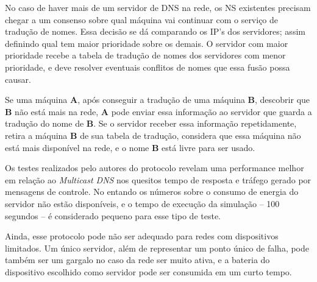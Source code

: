     No caso de haver mais de um servidor de DNS na rede, os NS existentes precisam
    chegar a um consenso sobre qual máquina vai continuar com o serviço de tradução
    de nomes. Essa decisão se dá comparando os IP's dos servidores; assim definindo
    qual tem maior prioridade sobre os demais. O servidor com maior prioridade recebe
    a tabela de tradução de nomes dos servidores com menor prioridade, e deve resolver
    eventuais conflitos de nomes que essa fusão possa causar.
  
    Se uma máquina \textbf{A}, após conseguir a tradução de uma máquina \textbf{B},
    descobrir que \textbf{B} não está mais na rede, \textbf{A} pode enviar essa 
    informação ao servidor que guarda a tradução do nome de \textbf{B}. Se o servidor
    receber essa informação repetidamente, retira a máquina \textbf{B} de sua 
    tabela de tradução, considera que essa máquina não está mais disponível na 
    rede, e o nome \textbf{B} está livre para ser usado.
  
    Os testes realizados pelo autores do protocolo revelam uma performance melhor
    em relação ao \textit{Multicast DNS} nos quesitos tempo de resposta e tráfego
    gerado por mensagens de controle. No entando os números sobre o consumo de 
    energia do servidor não estão disponíveis, e o tempo de execução da simulação
    -- 100 segundos -- é considerado pequeno para esse tipo de teste.
    
    Ainda, esse protocolo pode não ser adequado para redes com dispositivos
    limitados. Um único servidor, além de representar um ponto único de falha,
    pode também ser um gargalo no caso da rede ser muito ativa, e a bateria do
    dispositivo escolhido como servidor pode ser consumida em um curto tempo.